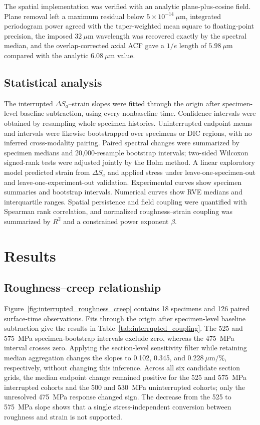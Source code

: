 \documentclass[final,12pt]{cas-sc}
\begin{document}
The spatial implementation was verified with an analytic plane-plus-cosine field. Plane removal left a maximum residual below $5\times10^{-14}~\mu$m, integrated periodogram power agreed with the taper-weighted mean square to floating-point precision, the imposed $32~\mu$m wavelength was recovered exactly by the spectral median, and the overlap-corrected axial ACF gave a $1/e$ length of $5.98~\mu$m compared with the analytic $6.08~\mu$m value.

\subsection{Statistical analysis}

The interrupted $\Delta S_a$--strain slopes were fitted through the origin after specimen-level baseline subtraction, using every nonbaseline time. Confidence intervals were obtained by resampling whole specimen histories. Uninterrupted endpoint means and intervals were likewise bootstrapped over specimens or DIC regions, with no inferred cross-modality pairing. Paired spectral changes were summarized by specimen medians and 20,000-resample bootstrap intervals; two-sided Wilcoxon signed-rank tests were adjusted jointly by the Holm method. A linear exploratory model predicted strain from $\Delta S_a$ and applied stress under leave-one-specimen-out and leave-one-experiment-out validation. Experimental curves show specimen summaries and bootstrap intervals. Numerical curves show RVE medians and interquartile ranges. Spatial persistence and field coupling were quantified with Spearman rank correlation, and normalized roughness--strain coupling was summarized by $R^2$ and a constrained power exponent $\beta$.
\fi
\FloatBarrier

\section{Results}

\subsection{Roughness--creep relationship}

Figure~\ref{fig:interrupted_roughness_creep} contains 18 specimens and 126 paired surface-time observations. Fits through the origin after specimen-level baseline subtraction give the results in Table~\ref{tab:interrupted_coupling}. The 525 and 575~MPa specimen-bootstrap intervals exclude zero, whereas the 475~MPa interval crosses zero. Applying the section-level sensitivity filter while retaining median aggregation changes the slopes to 0.102, 0.345, and $0.228~\mu$m/\%, respectively, without changing this inference. Across all six candidate section grids, the median endpoint change remained positive for the 525 and 575~MPa interrupted cohorts and the 500 and 530~MPa uninterrupted cohorts; only the unresolved 475~MPa response changed sign. The decrease from the 525 to 575~MPa slope shows that a single stress-independent conversion between roughness and strain is not supported.
\end{document}

